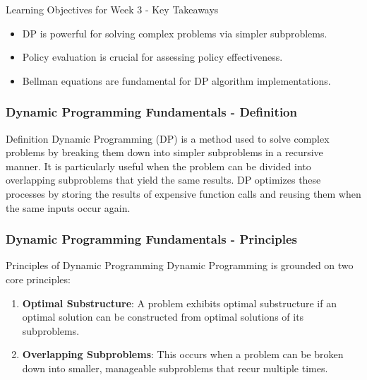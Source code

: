 \documentclass[aspectratio=169]{beamer}
\begin{document}
\begin{frame}{Learning Objectives for Week 3 - Key Takeaways}
    \begin{itemize}
        \item DP is powerful for solving complex problems via simpler subproblems.
        \item Policy evaluation is crucial for assessing policy effectiveness.
        \item Bellman equations are fundamental for DP algorithm implementations.
    \end{itemize}
\end{frame}

\begin{frame}[fragile]
    \frametitle{Dynamic Programming Fundamentals - Definition}
    \begin{block}{Definition}
        Dynamic Programming (DP) is a method used to solve complex problems by breaking them down into simpler subproblems in a recursive manner. 
        It is particularly useful when the problem can be divided into overlapping subproblems that yield the same results. 
        DP optimizes these processes by storing the results of expensive function calls and reusing them when the same inputs occur again.
    \end{block}
\end{frame}

\begin{frame}[fragile]
    \frametitle{Dynamic Programming Fundamentals - Principles}
    \begin{block}{Principles of Dynamic Programming}
        Dynamic Programming is grounded on two core principles:
        \begin{enumerate}
            \item \textbf{Optimal Substructure}: A problem exhibits optimal substructure if an optimal solution can be constructed from optimal solutions of its subproblems.
            \item \textbf{Overlapping Subproblems}: This occurs when a problem can be broken down into smaller, manageable subproblems that recur multiple times.
        \end{enumerate}
    \end{block}
\end{frame}
\end{document}
